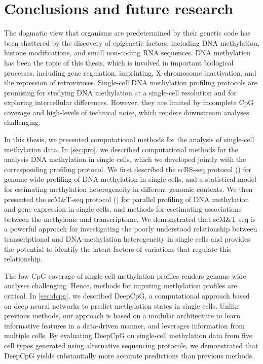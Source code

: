 \chapter{Conclusions and future research} \label{sec:sum}

\ifpdf
    \graphicspath{{Chapter6/Figs/Raster/}{Chapter6/Figs/PDF/}{Chapter6/Figs/}}
\else
    \graphicspath{{Chapter6/Figs/Vector/}{Chapter6/Figs/}}
\fi

The dogmatic view that organisms are predetermined by their genetic code has been shattered by the discovery of epigenetic factors, including DNA methylation, histone modifications, and small non-coding RNA sequences. DNA methylation has been the topic of this thesis, which is involved in important biological processes, including gene regulation, imprinting, X-chromosome inactivation, and the repression of retroviruses. Single-cell DNA methylation profiling protocols are promising for studying DNA methylation at a single-cell resolution and for exploring intercellular differences. However, they are limited by incomplete CpG coverage and high-levels of technical noise, which renders downstream analyses challenging.

In this thesis, we presented computational methods for the analysis of single-cell methylation data. In \cref{sec:pro}, we described computational methods for the analysis DNA methylation in single cells, which we developed jointly with the corresponding profiling protocol. We first described the scBS-seq protocol () for genome-wide profiling of DNA methylation in single cells, and a statistical model for estimating methylation heterogeneity in different genomic contexts. We then presented the scM\&T-seq protocol () for parallel profiling of DNA methylation and gene expression in single cells, and methods for esetimating associations between the methylome and transcriptome. We demonstrated that scM\&T-seq is a powerful approach for investigating the poorly understood relationship between transcriptional and DNA-methylation heterogeneity in single cells and provides the potential to identify the latent factors of variations that regulate this relationship.

The low CpG coverage of single-cell methylation profiles renders genome wide analyses challenging. Hence, methods for imputing methylation profiles are critical. In \cref{sec:dcpg}, we described DeepCpG, a computational approach based on deep neural networks to predict methylation states in single cells. Unlike previous methods, our approach is based on a modular architecture to learn informative features in a data-driven manner, and leverages information from multiple cells. By evaluating DeepCpG on single-cell methylation data from five cell types generated using alternative sequencing protocols, we demonstrated that DeepCpG yields substantially more accurate predictions than previous methods.


